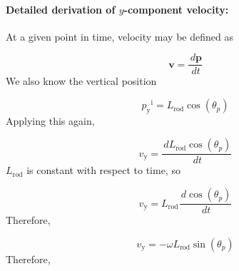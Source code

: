 \documentclass[12pt]{article}
\begin{document}
\paragraph{Detailed derivation of $y$-component velocity:}
\label{GD:velocityIYDeriv}
At a given point in time, velocity may be defined as

\begin{displaymath}
\mathbf{v}=\frac{\,d\mathbf{p}}{\,dt}
\end{displaymath}
We also know the vertical position

\begin{displaymath}
{{p_{\text{y}}}^{\text{i}}}={L_{\text{rod}}} \cos\left({θ_{p}}\right)
\end{displaymath}
Applying this again,

\begin{displaymath}
{v_{\text{y}}}=\frac{\,d{L_{\text{rod}}} \cos\left({θ_{p}}\right)}{\,dt}
\end{displaymath}
${L_{\text{rod}}}$ is constant with respect to time, so

\begin{displaymath}
{v_{\text{y}}}={L_{\text{rod}}} \frac{\,d\cos\left({θ_{p}}\right)}{\,dt}
\end{displaymath}
Therefore,

\begin{displaymath}
{v_{\text{y}}}=-ω {L_{\text{rod}}} \sin\left({θ_{p}}\right)
\end{displaymath}
Therefore,
\end{document}
